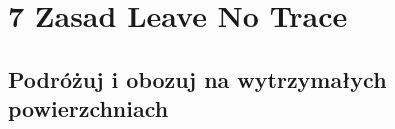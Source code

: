 \documentclass[11pt,fleqn]{book} %
\begin{document}
\usechapterimagefalse %


\pagestyle{empty} %

\tableofcontents %

\cleardoublepage %

\pagestyle{fancy} %


\usechapterimagetrue

\part{7 Zasad Leave No Trace}





\chapter{Podróżuj i obozuj na wytrzymałych powierzchniach}
\label{rule2-camp-and-travel}

\lipsum 
\end{document}
